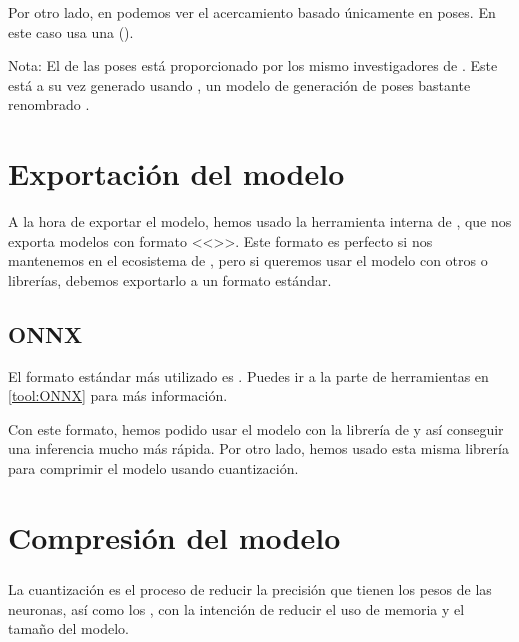 Por otro lado, en  podemos ver el acercamiento basado únicamente en poses. En este caso usa una  ().

Nota: El  de las poses está proporcionado por los mismo investigadores de  . Este  está a su vez generado usando , un modelo de generación de poses bastante renombrado .


\section{Exportación del modelo}

A la hora de exportar el modelo, hemos usado la herramienta interna de , que nos exporta modelos con formato <<>>. Este formato es perfecto si nos mantenemos en el ecosistema de , pero si queremos usar el modelo con otros  o librerías, debemos exportarlo a un formato estándar.

\subsection{ONNX}

El formato estándar más utilizado es . Puedes ir a la parte de herramientas en \ref{tool:ONNX} para más información.

Con este formato, hemos podido usar el modelo con la librería de  y así conseguir una inferencia mucho más rápida. Por otro lado, hemos usado esta misma librería para comprimir el modelo usando cuantización.


\section{Compresión del modelo}

\subsubsection{}

La cuantización es el proceso de reducir la precisión que tienen los pesos de las neuronas, así como los , con la intención de reducir el uso de memoria y el tamaño del modelo.


